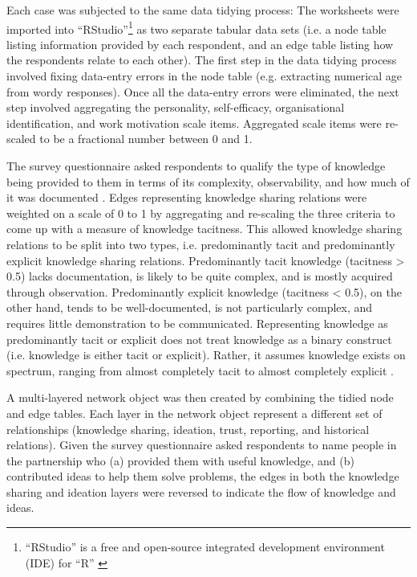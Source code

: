 Each case was subjected to the same data tidying process: The worksheets were imported into \enquote{RStudio}\footnote{\enquote{RStudio} is a free and open-source integrated development environment (IDE) for \enquote{R} \citep{rstudio2016rstudio}} as two separate tabular data sets (i.e. a node table listing information provided by each respondent, and an edge table listing how the respondents relate to each other). The first step in the data tidying process involved fixing data-entry errors in the node table (e.g. extracting numerical age from wordy responses). Once all the data-entry errors were eliminated, the next step involved aggregating the personality, self-efficacy, organisational identification, and work motivation scale items. Aggregated scale items were re-scaled to be a fractional number between 0 and 1. \medskip

The survey questionnaire asked respondents to qualify the type of knowledge being provided to them in terms of its complexity, observability, and how much of it was documented \citep{winter1987knowledge,zander1995knowledge,cavusgil2003tacit}. Edges representing knowledge sharing relations were weighted on a scale of 0 to 1 by aggregating and re-scaling the three criteria to come up with a measure of knowledge tacitness. This allowed knowledge sharing relations to be split into two types, i.e. predominantly tacit and predominantly explicit knowledge sharing relations. Predominantly tacit knowledge (tacitness > 0.5) lacks documentation, is likely to be quite complex, and is mostly acquired through observation. Predominantly explicit knowledge (tacitness < 0.5), on the other hand, tends to be well-documented, is not particularly complex, and requires little demonstration to be communicated. Representing knowledge as predominantly tacit or explicit does not treat knowledge as a binary construct (i.e. knowledge is either tacit or explicit). Rather, it assumes knowledge exists on spectrum, ranging from almost completely tacit to almost completely explicit \citep{leonard1998role}. \medskip

A multi-layered network object was then created by combining the tidied node and edge tables. Each layer in the network object represent a different set of relationships (knowledge sharing, ideation, trust, reporting, and historical relations). Given the survey questionnaire asked respondents to name people in the partnership who (a) provided them with useful knowledge, and (b) contributed ideas to help them solve problems, the edges in both the knowledge sharing and ideation layers were reversed to indicate the flow of knowledge and ideas. \medskip

